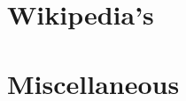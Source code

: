 \documentclass{article}
\begin{document}

\section{Wikipedia's}


\section{Miscellaneous}


\printbibliography[heading=bibintoc]
	
\end{document}
